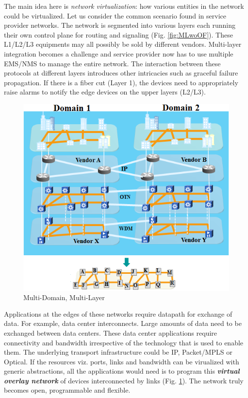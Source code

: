 \documentclass{sig-alternate-10pt}
\begin{document}
	The main idea here is \emph{network virtualization}: how various entities in the network could be virtualized.
	Let us consider the common scenario found in service provider networks. The network is segmented into
	various layers each running their own control plane for routing and signaling (Fig. \ref{fig:MLwoOF}).
	These L1/L2/L3 equipments may all possibly be sold by different vendors. Multi-layer integration becomes
	a challenge and service provider now has to use multiple EMS/NMS to manage the entire network. The
	interaction between these protocols at different layers introduces other intricacies such as graceful
	failure propagation. If there is a fiber cut (Layer 1), the devices need to appropriately raise alarms to
	notify the edge devices on the upper layers (L2/L3). \\

\begin{figure}[htb]
	\centering
	\includegraphics[scale=0.50]{MultiDomainLayer.png}
	\caption{Multi-Domain, Multi-Layer}
	\label{fig:MDL}
	\end{figure}
	
	Applications at the edges of these networks require datapath for exchange of data. For example, data
	center interconnects. Large amounts of data need to be exchanged between data centers. These data center
	applications require connectivity and bandwidth irrespective of the technology that is used to enable
	them. The underlying transport infrastructure could be IP, Packet/MPLS or Optical. If the resources viz.
	ports, links and bandwidth can be virualized with generic abstractions, all the applications would need
	is to program this \emph{\bf virtual overlay network} of devices interconnected by links (Fig.
	\ref{fig:MDL}). The network truly becomes open, programmable and flexible. \\
		
\end{document}
